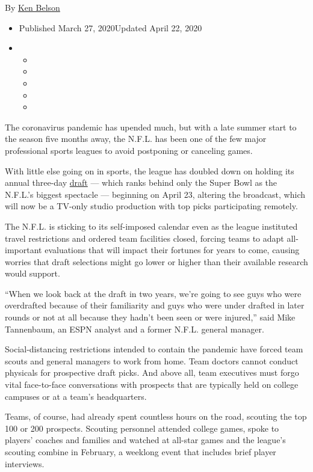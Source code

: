 By \href{https://www.nytimes3xbfgragh.onion/by/ken-belson}{Ken Belson}

\begin{itemize}
\item
  Published March 27, 2020Updated April 22, 2020
\item
  \begin{itemize}
  \item
  \item
  \item
  \item
  \item
  \end{itemize}
\end{itemize}

The coronavirus pandemic has upended much, but with a late summer start
to the season five months away, the N.F.L. has been one of the few major
professional sports leagues to avoid postponing or canceling games.

With little else going on in sports, the league has doubled down on
holding its annual three-day
\href{https://www.nytimes3xbfgragh.onion/article/joe-burrow-nfl-draft.html}{draft}
--- which ranks behind only the Super Bowl as the N.F.L.'s biggest
spectacle --- beginning on April 23, altering the broadcast, which will
now be a TV-only studio production with top picks participating
remotely.

The N.F.L. is sticking to its self-imposed calendar even as the league
instituted travel restrictions and ordered team facilities closed,
forcing teams to adapt all-important evaluations that will impact their
fortunes for years to come, causing worries that draft selections might
go lower or higher than their available research would support.

``When we look back at the draft in two years, we're going to see guys
who were overdrafted because of their familiarity and guys who were
under drafted in later rounds or not at all because they hadn't been
seen or were injured,'' said Mike Tannenbaum, an ESPN analyst and a
former N.F.L. general manager.

Social-distancing restrictions intended to contain the pandemic have
forced team scouts and general managers to work from home. Team doctors
cannot conduct physicals for prospective draft picks. And above all,
team executives must forgo vital face-to-face conversations with
prospects that are typically held on college campuses or at a team's
headquarters.

Teams, of course, had already spent countless hours on the road,
scouting the top 100 or 200 prospects. Scouting personnel attended
college games, spoke to players' coaches and families and watched at
all-star games and the league's scouting combine in February, a weeklong
event that includes brief player interviews.

